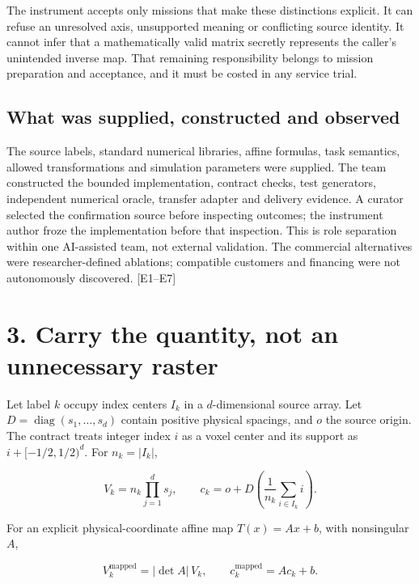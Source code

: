 \documentclass[10pt,a4paper]{article}
\begin{document}
The instrument accepts only missions that make these distinctions
explicit. It can refuse an unresolved axis, unsupported meaning or
conflicting source identity. It cannot infer that a mathematically valid
matrix secretly represents the caller's unintended inverse map. That
remaining responsibility belongs to mission preparation and acceptance,
and it must be costed in any service trial.

\hypertarget{what-was-supplied-constructed-and-observed}{%
\subsection{What was supplied, constructed and
observed}\label{what-was-supplied-constructed-and-observed}}

The source labels, standard numerical libraries, affine formulas, task
semantics, allowed transformations and simulation parameters were
supplied. The team constructed the bounded implementation, contract
checks, test generators, independent numerical oracle, transfer adapter
and delivery evidence. A curator selected the confirmation source before
inspecting outcomes; the instrument author froze the implementation
before that inspection. This is role separation within one AI-assisted
team, not external validation. The commercial alternatives were
researcher-defined ablations; compatible customers and financing were
not autonomously discovered. {[}E1--E7{]}

\clearpage

\hypertarget{carry-the-quantity-not-an-unnecessary-raster}{%
\section{3. Carry the quantity, not an unnecessary
raster}\label{carry-the-quantity-not-an-unnecessary-raster}}

Let label \(k\) occupy index centers \(I_k\) in a \(d\)-dimensional
source array. Let \(D=\operatorname{diag}(s_1,\ldots,s_d)\) contain
positive physical spacings, and \(o\) the source origin. The contract
treats integer index \(i\) as a voxel center and its support as
\(i+[-1/2,1/2)^d\). For \(n_k=|I_k|\),

\[
V_k=n_k\prod_{j=1}^{d}s_j,\qquad
c_k=o+D\left(\frac{1}{n_k}\sum_{i\in I_k}i\right).
\]

For an explicit physical-coordinate affine map \(T(x)=Ax+b\), with
nonsingular \(A\),

\[
V_k^{\mathrm{mapped}}=|\det A|\,V_k,\qquad
c_k^{\mathrm{mapped}}=Ac_k+b.
\]
\end{document}
